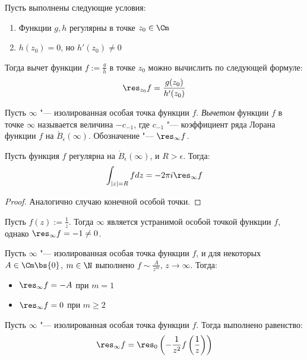 \begin{proposition}
	Пусть выполнены следующие условия:
	\begin{enumerate}
		\item Функции $g, h$ регулярны в точке $z_0 \in \Cm$
		\item $h(z_0) = 0$, но $h'(z_0) \ne 0$
	\end{enumerate}

	Тогда вычет функции $f := \frac{g}{h}$ в точке $z_0$ можно вычислить по следующей формуле:
	\[\res_{z_0}f = \frac{g(z_0)}{h'(z_0)}\]
\end{proposition}

\begin{definition}
	Пусть $\infty$ "--- изолированная особая точка функции $f$. \textit{Вычетом} функции $f$ в точке $\infty$ называется величина $-c_{-1}$, где $c_{-1}$ "--- коэффициент ряда Лорана функции $f$ на $\mathring B_\epsilon(\infty)$. Обозначение "--- $\res_{\infty}f$.
\end{definition}

\begin{proposition}
	Пусть функция $f$ регулярна на $\mathring B_\epsilon(\infty)$, и $R > \epsilon$. Тогда:
	\[\int_{|z| = R}fdz = -2\pi i\res_\infty f\]
\end{proposition}

\begin{proof}
	Аналогично случаю конечной особой точки.
\end{proof}

\begin{example}
	Пусть $f(z) := \frac 1z$. Тогда $\infty$ является устранимой особой точкой функции $f$, однако $\res_\infty{f} = -1 \ne 0$.
\end{example}

\begin{proposition}
	Пусть $\infty$ "--- изолированная особая точка функции $f$, и для некоторых $A \in \Cm \bs \{0\}$, $m \in \N$ выполнено $f \sim \frac{A}{z^m}$, $z \to \infty$. Тогда:
	\begin{itemize}
		\item $\res_\infty f = -A$ при $m = 1$
		\item $\res_\infty f = 0$ при $m \ge 2$
	\end{itemize}
\end{proposition}

\begin{proposition}
	Пусть $\infty$ "--- изолированная особая точка функции $f$. Тогда выполнено равенство:
	\[\res_\infty f = \res_0\left(-\frac1{z^2}f\left(\frac1z\right)\right)\]
\end{proposition}

